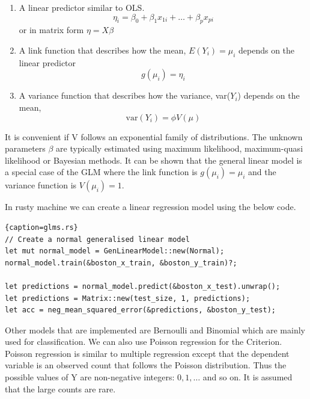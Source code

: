 \documentclass{book}
\begin{document}
\begin{enumerate}
	\item A linear predictor similar to OLS.
		\begin{equation}
			\eta_i = \beta_0 + \beta_1 x_{1i} + \dots + \beta_p x_{pi}
		\end{equation}
		or in matrix form $\eta = X \beta$

	\item A link function that describes how the mean, $E(Y_i) = \mu_i$ depends on the linear predictor
		\begin{equation}
			g(\mu_i) = \eta_i
		\end{equation}
	\item A variance function that describes how the variance, var($Y_i$) depends on the mean,
		\begin{equation}
			\text{var}(Y_i) = \phi V(\mu)
		\end{equation}
\end{enumerate}

It is convenient if V follows an exponential family of distributions. The unknown parameters $\beta$ are typically estimated using maximum likelihood, maximum-quasi likelihood or Bayesian methods. It can be shown that the general linear model is a special case of the GLM where the link function is $g(\mu_i) = \mu_i$ and the variance function is $V(\mu_i) = 1$.

In rusty machine we can create a linear regression model using the below code.

\begin{lstlisting}{caption=glms.rs}
// Create a normal generalised linear model
let mut normal_model = GenLinearModel::new(Normal);
normal_model.train(&boston_x_train, &boston_y_train)?;

let predictions = normal_model.predict(&boston_x_test).unwrap();
let predictions = Matrix::new(test_size, 1, predictions);
let acc = neg_mean_squared_error(&predictions, &boston_y_test);
\end{lstlisting}

Other models that are implemented are Bernoulli and Binomial which are mainly used for classification. We can also use Poisson regression for the Criterion. Poisson regression is similar to multiple regression except that the dependent variable is an observed count that follows the Poisson distribution. Thus the possible values of Y are non-negative integers: $0, 1, \dots$ and so on. It is assumed that the large counts are rare.
\end{document}
